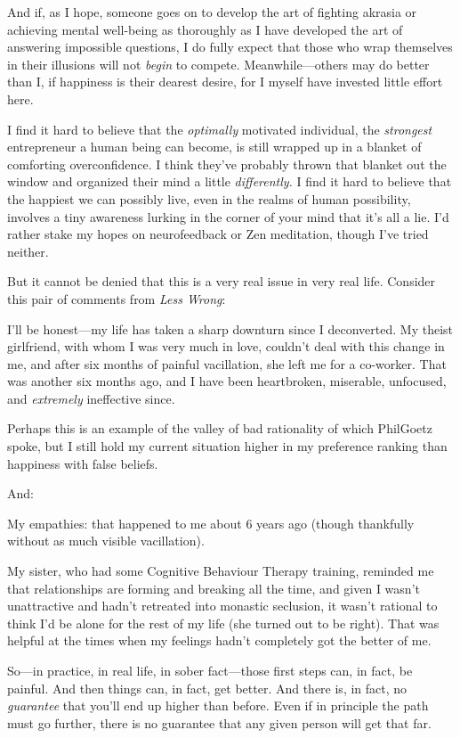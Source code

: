 {
 And if, as I hope, someone goes on to develop the art of fighting
akrasia or achieving mental well-being as thoroughly as I have
developed the art of answering impossible questions, I do fully expect
that those who wrap themselves in their illusions will not
\textit{begin} to compete. Meanwhile---others may do better than I, if
happiness is their dearest desire, for I myself have invested little
effort here.}

{
 I find it hard to believe that the \textit{optimally} motivated
individual, the \textit{strongest} entrepreneur a human being can
become, is still wrapped up in a blanket of comforting overconfidence.
I think they've probably thrown that blanket out the
window and organized their mind a little \textit{differently.} I find
it hard to believe that the happiest we can possibly live, even in the
realms of human possibility, involves a tiny awareness lurking in the
corner of your mind that it's all a lie.
I'd rather stake my hopes on neurofeedback or Zen
meditation, though I've tried neither.}

{
 But it cannot be denied that this is a very real issue in very
real life. Consider this pair of comments from \textit{Less Wrong}:}

{
 I'll be honest---my life has taken a sharp
downturn since I deconverted. My theist girlfriend, with whom I was
very much in love, couldn't deal with this change in
me, and after six months of painful vacillation, she left me for a
co-worker. That was another six months ago, and I have been
heartbroken, miserable, unfocused, and \textit{extremely} ineffective
since.}

{
 Perhaps this is an example of the valley of bad rationality of
which PhilGoetz spoke, but I still hold my current situation higher in
my preference ranking than happiness with false beliefs.}

{
 And:}

{
 My empathies: that happened to me about 6 years ago (though
thankfully without as much visible vacillation).}

{
 My sister, who had some Cognitive Behaviour Therapy training,
reminded me that relationships are forming and breaking all the time,
and given I wasn't unattractive and
hadn't retreated into monastic seclusion, it
wasn't rational to think I'd be alone
for the rest of my life (she turned out to be right). That was helpful
at the times when my feelings hadn't completely got the
better of me.}

{
 So---in practice, in real life, in sober fact---those first steps
can, in fact, be painful. And then things can, in fact, get better. And
there is, in fact, no \textit{guarantee} that you'll
end up higher than before. Even if in principle the path must go
further, there is no guarantee that any given person will get that
far.}

